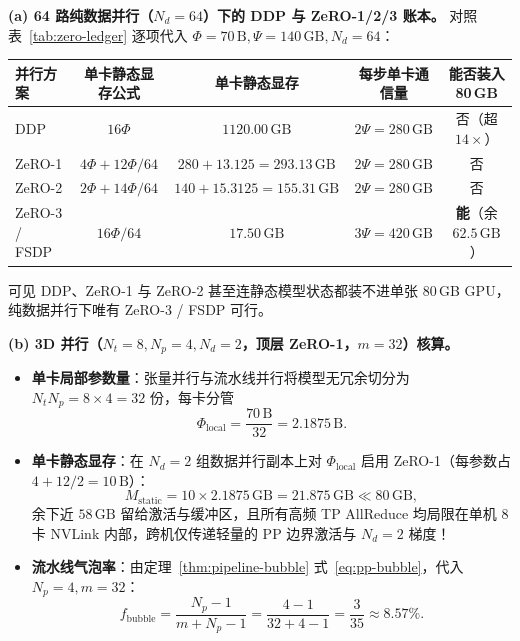\textbf{(a) 64 路纯数据并行（$N_d = 64$）下的 DDP 与 ZeRO-1/2/3 账本。} 对照表~\ref{tab:zero-ledger} 逐项代入 $\Phi = 70\,\mathrm{B}, \Psi = 140\,\mathrm{GB}, N_d = 64$：
\begin{center}
\footnotesize
\setlength{\tabcolsep}{4.5pt}
\begin{tabular}{@{}lcccc@{}}
\toprule
并行方案 & 单卡静态显存公式 & 单卡静态显存 & 每步单卡通信量 & 能否装入 80\,GB \\
\midrule
DDP & $16\Phi$ & $1120.00\,\mathrm{GB}$ & $2\Psi = 280\,\mathrm{GB}$ & 否（超 $14\times$） \\
ZeRO-1 & $4\Phi + 12\Phi / 64$ & $280 + 13.125 = \mathbf{293.13\,\mathrm{GB}}$ & $2\Psi = 280\,\mathrm{GB}$ & 否 \\
ZeRO-2 & $2\Phi + 14\Phi / 64$ & $140 + 15.3125 = \mathbf{155.31\,\mathrm{GB}}$ & $2\Psi = 280\,\mathrm{GB}$ & 否 \\
ZeRO-3 / FSDP & $16\Phi / 64$ & $\mathbf{17.50\,\mathrm{GB}}$ & $3\Psi = 420\,\mathrm{GB}$ & \textbf{能}（余 $62.5\,\mathrm{GB}$） \\
\bottomrule
\end{tabular}
\end{center}
可见 DDP、ZeRO-1 与 ZeRO-2 甚至连静态模型状态都装不进单张 80\,GB GPU，纯数据并行下唯有 ZeRO-3 / FSDP 可行。

\textbf{(b) 3D 并行（$N_t = 8, N_p = 4, N_d = 2$，顶层 ZeRO-1，$m = 32$）核算。}
\begin{itemize}
  \item \textbf{单卡局部参数量}：张量并行与流水线并行将模型无冗余切分为 $N_t N_p = 8 \times 4 = 32$ 份，每卡分管
  \[
    \Phi_{\mathrm{local}} = \frac{70\,\mathrm{B}}{32} = \mathbf{2.1875\,\mathrm{B}}.
  \]
  \item \textbf{单卡静态显存}：在 $N_d = 2$ 组数据并行副本上对 $\Phi_{\mathrm{local}}$ 启用 ZeRO-1（每参数占 $4 + 12 / 2 = 10\,\mathrm{B}$）：
  \[
    M_{\mathrm{static}} = 10 \times 2.1875\,\mathrm{GB} = \mathbf{21.875\,\mathrm{GB}} \ll 80\,\mathrm{GB},
  \]
  余下近 $58\,\mathrm{GB}$ 留给激活与缓冲区，且所有高频 TP AllReduce 均局限在单机 8 卡 NVLink 内部，跨机仅传递轻量的 PP 边界激活与 $N_d = 2$ 梯度！
  \item \textbf{流水线气泡率}：由定理~\ref{thm:pipeline-bubble} 式~\eqref{eq:pp-bubble}，代入 $N_p = 4, m = 32$：
  \[
    f_{\mathrm{bubble}} = \frac{N_p - 1}{m + N_p - 1} = \frac{4 - 1}{32 + 4 - 1} = \frac{3}{35} \approx \mathbf{8.57\%}.
  \]
\end{itemize}


